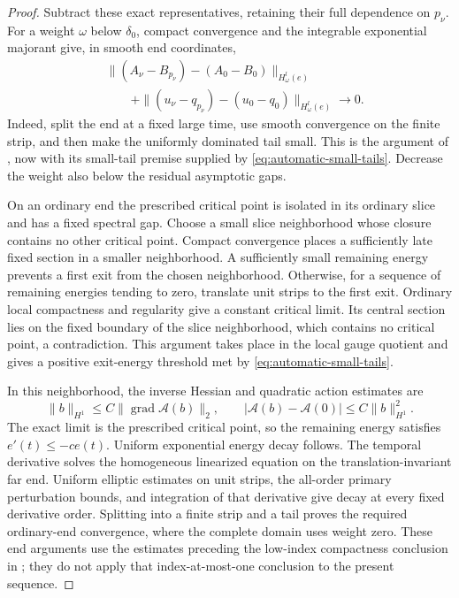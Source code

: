 \documentclass[11pt]{amsart}
\theoremstyle{definition}
\theoremstyle{remark}
\theoremstyle{plain}
\begin{document}
\begin{proof}
Subtract these exact representatives, retaining their
full dependence on $p_\nu$. For a weight $\omega$ below
$\delta_0$, compact convergence and the integrable
exponential majorant give, in smooth end coordinates,
\begin{equation}\label{eq:automatic-weighted-ends}
\begin{split}
 &\|(A_\nu-B_{p_\nu})-(A_0-B_0)\|_{H^l_\omega(e)}\\
 &\qquad +\|(u_\nu-q_{p_\nu})-(u_0-q_0)\|_{H^l_\omega(e)}
                                                     \longrightarrow0.
\end{split}
\end{equation}
Indeed, split the end at a fixed large time, use smooth
convergence on the finite strip, and then make the
uniformly dominated tail small. This is the argument of
\cite[equation~(5.36)]{DaeFukLip21a}, now with its
small-tail premise supplied by
\eqref{eq:automatic-small-tails}. Decrease the weight
also below the residual asymptotic gaps.

On an ordinary end the prescribed critical point is
isolated in its ordinary slice and has a fixed spectral
gap. Choose a small slice neighborhood whose closure
contains no other critical point. Compact convergence
places a sufficiently late fixed section in a smaller
neighborhood. A sufficiently small remaining energy
prevents a first exit from the chosen neighborhood.
Otherwise, for a sequence of remaining energies tending
to zero, translate unit strips to the first exit.
Ordinary local compactness and regularity give a constant
critical limit. Its central section lies on the fixed
boundary of the slice neighborhood, which contains no
critical point, a contradiction. This argument takes
place in the local gauge quotient and gives a positive
exit-energy threshold met by
\eqref{eq:automatic-small-tails}.

In this neighborhood, the inverse Hessian and quadratic
action estimates are
\[
 \|b\|_{H^1}\leq C\|\operatorname{grad}\mathcal A(b)\|_2,
       \qquad |\mathcal A(b)-\mathcal A(0)|
                                      \leq C\|b\|_{H^1}^2.
\]
The exact limit is the prescribed critical point, so the
remaining energy satisfies $e'(t)\leq-ce(t)$.
Uniform exponential energy decay follows. The temporal
derivative solves the homogeneous linearized equation
on the translation-invariant far end. Uniform elliptic
estimates on unit strips, the all-order primary
perturbation bounds, and integration of that derivative
give decay at every fixed derivative order. Splitting
into a finite strip and a tail proves the required
ordinary-end convergence, where the complete domain
uses weight zero. These end arguments use the estimates
preceding the low-index compactness conclusion in
\cite[Section~5.4]{DaeFukLip21a}; they do not apply that
index-at-most-one conclusion to the present sequence.
\end{proof}
\end{document}

